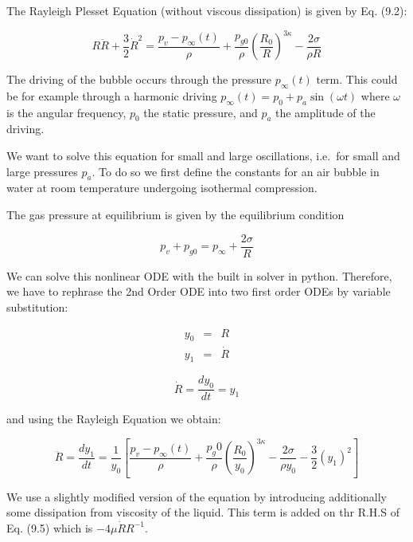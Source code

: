 \documentclass{article}
\begin{document}
The Rayleigh Plesset Equation (without viscous dissipation) is given by
Eq. (9.2):

\begin{equation}
R \ddot{R} +\frac{3}{2} \dot{R}^2=\frac{p_v-p_\infty(t)}{\rho}+\frac{p_{g0}}{\rho}\left(\frac{R_0}{R}\right)^{3\kappa}-\frac{2\sigma}{\rho R}\label{9.2}\tag{9.2}
\end{equation}

The driving of the bubble occurs through the pressure \(p_\infty(t)\)
term. This could be for example through a harmonic driving
\(p_\infty(t)=p_0 + p_a \sin (\omega t)\) where \(\omega\) is the
angular frequency, \(p_0\) the static pressure, and \(p_a\) the
amplitude of the driving.

We want to solve this equation for small and large oscillations,
i.e.~for small and large pressures \(p_a\). To do so we first define the
constants for an air bubble in water at room temperature undergoing
isothermal compression.

The gas pressure at equilibrium is given by the equilibrium condition

\begin{equation}
p_v+p_{g0}=p_\infty+\frac{2\sigma}{R}\label{9.3}\tag{9.3}
\end{equation}

We can solve this nonlinear ODE with the built in solver in python.
Therefore, we have to rephrase the 2nd Order ODE into two first order
ODEs by variable substitution:

\begin{eqnarray}
y_0&=&R\\
y_1&=&\dot{R}
\end{eqnarray}

\begin{equation}
\dot{R}=\frac{dy_0}{dt}=y_1\label{9.4}\tag{9.4}
\end{equation}

and using the Rayleigh Equation we obtain:

\begin{equation}
\ddot{R}=\frac{dy_1}{dt}=\frac{1}{y_0}\left[
\frac{p_v-p_\infty(t)}{\rho}+\frac{p_g0}{\rho}\left(\frac{R_0}{y_0}\right)^{3\kappa}-\frac{2\sigma}{\rho y_0}-\frac{3}{2}(y_1)^2
\right]\label{9.5}\tag{9.5}
\end{equation}

We use a slightly modified version of the equation by introducing
additionally some dissipation from viscosity of the liquid. This term is
added on thr R.H.S of Eq. (9.5) which is \(-4\mu\dot{R}{R}^{-1}\).
\end{document}

